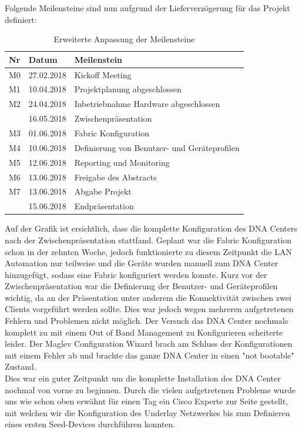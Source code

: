 Folgende Meilensteine sind nun aufgrund der Lieferverzögerung für das Projekt definiert:
\begin{table}[H]
	\centering
	\begin{tabularx}{\textwidth}{p{1cm}| p{2.5cm}| X}
		\rowcolor{gray!50}
		\textbf{Nr} & \textbf{Datum} & \textbf{Meilenstein} \\
		\hline	
		M0 & 27.02.2018 & Kickoff Meeting \\
		M1 & 10.04.2018 & Projektplanung abgeschlossen \\
		M2 & 24.04.2018 & Inbetriebnahme Hardware abgeschlossen \\
		   & 16.05.2018 & Zwischenpräsentation \\
		M3 & 01.06.2018 & Fabric Konfiguration \\
		M4 & 10.06.2018 & Definierung von Benutzer- und Geräteprofilen \\
		M5 & 12.06.2018 & Reporting und Monitoring \\
		M6 & 13.06.2018 & Freigabe des Abstracts \\
		M7 & 13.06.2018 & Abgabe Projekt \\
		   & 15.06.2018 & Endpräsentation \\
	\end{tabularx}
	\caption{Erweiterte Anpassung der Meilensteine}
	\label{tab:Erweiterte Anpassung der Meilensteine}
\end{table}

Auf der Grafik ist ersichtlich, dass die komplette Konfiguration des DNA Centers nach der Zwischenpräsentation stattfand. Geplant war die Fabric Konfiguration schon in der zehnten Woche, jedoch funktionierte zu diesem Zeitpunkt die LAN Automation nur teilweise und die Geräte wurden manuell zum DNA Center hinzugefügt, sodass eine Fabric konfiguriert werden konnte. Kurz vor der Zwischenpräsentation war die Definierung der Benutzer- und Geräteprofilen wichtig, da an der Präsentation unter anderem die Konnektivität zwischen zwei Clients vorgeführt werden sollte. Dies war jedoch wegen mehreren aufgetretenen Fehlern und Problemen nicht möglich. Der Versuch das DNA Center nochmals komplett zu mit einem Out of Band Management zu Konfigurieren scheiterte leider. Der Maglev Configuration Wizard brach am Schluss der Konfigurationen mit einem Fehler ab und brachte das ganze DNA Center in einen "not bootable" Zustand. \\
Dies war ein guter Zeitpunkt um die komplette Installation des DNA Center nochmal von vorne zu beginnen. Durch die vielen aufgetretenen Probleme wurde uns wie schon oben erwähnt für einen Tag ein Cisco Experte zur Seite gestellt, mit welchen wir die Konfiguration des Underlay Netzwerkes bis zum Definieren eines ersten Seed-Devices durchführen konnten.




